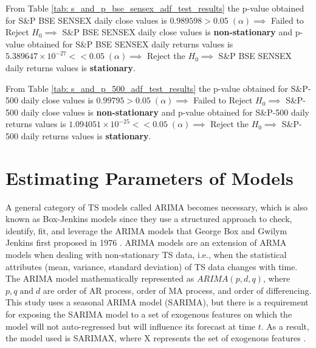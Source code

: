 \documentclass[conference]{IEEEtran}
\begin{document}
From Table \ref{tab: s_and_p_bse_sensex_adf_test_results} the p-value obtained for S\&P BSE SENSEX daily close values is $0.989598 > 0.05 \;(\alpha) \implies$ Failed to Reject $H_{0} \implies$ S\&P BSE SENSEX daily close values is \textbf{non-stationary} and p-value obtained for S\&P BSE SENSEX daily returns values is $5.389647 \times 10^{-27} << 0.05 \;(\alpha) \implies$ Reject the $H_{0} \implies$ S\&P BSE SENSEX daily returns values is \textbf{stationary}.

\begin{table}[htbp]
	\caption{S\&P-500 Augmented Dickey Fuller Test Results.}
	\label{tab: s_and_p_500_adf_test_results}
\end{table}

From Table \ref{tab: s_and_p_500_adf_test_results} the p-value obtained for S\&P-500 daily close values is $0.99795 > 0.05 \;(\alpha) \implies$ Failed to Reject $H_{0} \implies$ S\&P-500 daily close values is \textbf{non-stationary} and p-value obtained for S\&P-500 daily returns values is $1.094051 \times 10^{-25} << 0.05 \;(\alpha) \implies $ Reject the $H_{0} \implies$ S\&P-500 daily returns values is \textbf{stationary}.

\section{Estimating Parameters of Models} \label{estimating_parameters_of_models}
A general category of TS models called ARIMA becomes necessary, which is also known as Box-Jenkins models since they use a structured approach to check, identify, fit, and leverage the ARIMA models that George Box and Gwilym Jenkins first proposed in 1976 \cite{b6}.
ARIMA models are an extension of ARMA models when dealing with non-stationary TS data, i.e., when the statistical attributes (mean, variance, standard deviation) of TS data changes with time. The ARIMA model mathematically represented as $ARIMA(p, d, q)$, where $p, q \;\text{and}\; d$ are order of AR process, order of MA process, and order of differencing.
This study uses a seasonal ARIMA model (SARIMA), but there is a requirement for exposing the SARIMA model to a set of exogenous features on which the model will not auto-regressed but will influence its forecast at time $t$. As a result, the model used is SARIMAX, where X represents the set of exogenous features \cite{b17}.
\end{document}

